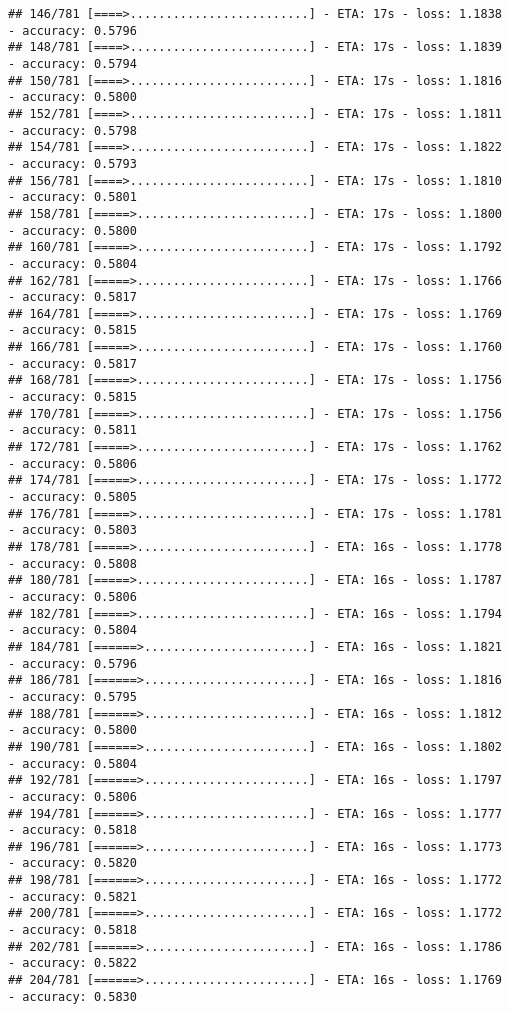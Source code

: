 \documentclass[
]{article}
\begin{document}
\begin{verbatim}
## 146/781 [====>.........................] - ETA: 17s - loss: 1.1838 - accuracy: 0.5796
## 148/781 [====>.........................] - ETA: 17s - loss: 1.1839 - accuracy: 0.5794
## 150/781 [====>.........................] - ETA: 17s - loss: 1.1816 - accuracy: 0.5800
## 152/781 [====>.........................] - ETA: 17s - loss: 1.1811 - accuracy: 0.5798
## 154/781 [====>.........................] - ETA: 17s - loss: 1.1822 - accuracy: 0.5793
## 156/781 [====>.........................] - ETA: 17s - loss: 1.1810 - accuracy: 0.5801
## 158/781 [=====>........................] - ETA: 17s - loss: 1.1800 - accuracy: 0.5800
## 160/781 [=====>........................] - ETA: 17s - loss: 1.1792 - accuracy: 0.5804
## 162/781 [=====>........................] - ETA: 17s - loss: 1.1766 - accuracy: 0.5817
## 164/781 [=====>........................] - ETA: 17s - loss: 1.1769 - accuracy: 0.5815
## 166/781 [=====>........................] - ETA: 17s - loss: 1.1760 - accuracy: 0.5817
## 168/781 [=====>........................] - ETA: 17s - loss: 1.1756 - accuracy: 0.5815
## 170/781 [=====>........................] - ETA: 17s - loss: 1.1756 - accuracy: 0.5811
## 172/781 [=====>........................] - ETA: 17s - loss: 1.1762 - accuracy: 0.5806
## 174/781 [=====>........................] - ETA: 17s - loss: 1.1772 - accuracy: 0.5805
## 176/781 [=====>........................] - ETA: 17s - loss: 1.1781 - accuracy: 0.5803
## 178/781 [=====>........................] - ETA: 16s - loss: 1.1778 - accuracy: 0.5808
## 180/781 [=====>........................] - ETA: 16s - loss: 1.1787 - accuracy: 0.5806
## 182/781 [=====>........................] - ETA: 16s - loss: 1.1794 - accuracy: 0.5804
## 184/781 [======>.......................] - ETA: 16s - loss: 1.1821 - accuracy: 0.5796
## 186/781 [======>.......................] - ETA: 16s - loss: 1.1816 - accuracy: 0.5795
## 188/781 [======>.......................] - ETA: 16s - loss: 1.1812 - accuracy: 0.5800
## 190/781 [======>.......................] - ETA: 16s - loss: 1.1802 - accuracy: 0.5804
## 192/781 [======>.......................] - ETA: 16s - loss: 1.1797 - accuracy: 0.5806
## 194/781 [======>.......................] - ETA: 16s - loss: 1.1777 - accuracy: 0.5818
## 196/781 [======>.......................] - ETA: 16s - loss: 1.1773 - accuracy: 0.5820
## 198/781 [======>.......................] - ETA: 16s - loss: 1.1772 - accuracy: 0.5821
## 200/781 [======>.......................] - ETA: 16s - loss: 1.1772 - accuracy: 0.5818
## 202/781 [======>.......................] - ETA: 16s - loss: 1.1786 - accuracy: 0.5822
## 204/781 [======>.......................] - ETA: 16s - loss: 1.1769 - accuracy: 0.5830

\end{verbatim}
\end{document}
